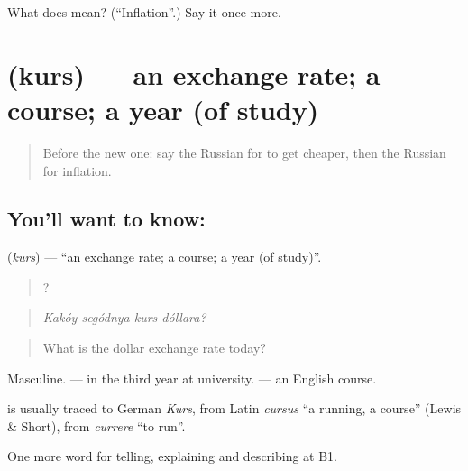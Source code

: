 \begin{tcolorbox}[breakable,colback=teal!4,colframe=teal!35!black,title={Before you move on}]
What does  mean? (\textquotedblleft{}Inflation\textquotedblright{}.) Say it once more.
\end{tcolorbox}
\section[\texorpdfstring{\ru{курс} (kurs)}{курс (kurs)}]{ (kurs) — an exchange rate; a course; a year (of study)}

\label{lesson:RU-C396-kurs}



\begin{quote}
Before the new one: say the Russian for to get cheaper, then the Russian for inflation.
\end{quote}

\subsection*{You'll want to know: }
\textbf{} (\emph{kurs}) — \textquotedblleft{}an exchange rate; a course; a year (of study)\textquotedblright{}.

\begin{quote}
   ?
\end{quote}

\begin{quote}
\emph{Kakóy segódnya kurs dóllara?}
\end{quote}

\begin{quote}
What is the dollar exchange rate today?
\end{quote}

Masculine. \emph{  } — in the third year at university. \emph{ } — an English course.

\begin{cousinweb}
\textbf{} is usually traced to German \emph{Kurs}, from Latin \emph{cursus} \textquotedblleft{}a running, a course\textquotedblright{} (Lewis \& Short), from \emph{currere} \textquotedblleft{}to run\textquotedblright{}.
\end{cousinweb}

\begin{grammarlens}[title={What you've built}]
One more word for telling, explaining and describing at B1.
\end{grammarlens}

